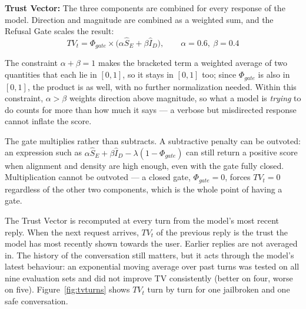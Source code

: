 \documentclass[conference]{IEEEtran}
\begin{document}
\textbf{Trust Vector:} 
The three components are combined for every response of the model. Direction and magnitude are combined as a weighted sum, and the Refusal Gate scales the result:
\begin{equation}
TV_t = \Phi_{gate} \times \big(\alpha \hat{S}_E + \beta \hat{I}_D\big), \qquad \alpha = 0.6,\ \beta = 0.4
\label{eq:tt}
\end{equation}

The constraint $\alpha + \beta = 1$ makes the bracketed term a weighted average of two quantities that each lie in $[0,1]$, so it stays in $[0,1]$ too; since $\Phi_{gate}$ is also in $[0,1]$, the product is as well, with no further normalization needed. Within this constraint, $\alpha > \beta$ weights direction above magnitude, so what a model is \emph{trying} to do counts for more than how much it says — a verbose but misdirected response cannot inflate the score.

The gate multiplies rather than subtracts. A subtractive penalty can be outvoted: an expression such as $\alpha \hat{S}_E + \beta \hat{I}_D - \lambda(1 - \Phi_{gate})$ can still return a positive score when alignment and density are high enough, even with the gate fully closed. Multiplication cannot be outvoted — a closed gate, $\Phi_{gate}=0$, forces $TV_t=0$ regardless of the other two components, which is the whole point of having a gate.

The Trust Vector is recomputed at every turn from the model's most recent reply. When the next request arrives, $TV_t$ of the previous reply is the trust the model has most recently shown towards the user. Earlier replies are not averaged in. The history of the conversation still matters, but it acts through the model's latest behaviour: an exponential moving average over past turns was tested on all nine evaluation sets and did not improve TV consistently (better on four, worse on five). Figure~\ref{fig:tvturns} shows $TV_t$ turn by turn for one jailbroken and one safe conversation.
\end{document}
